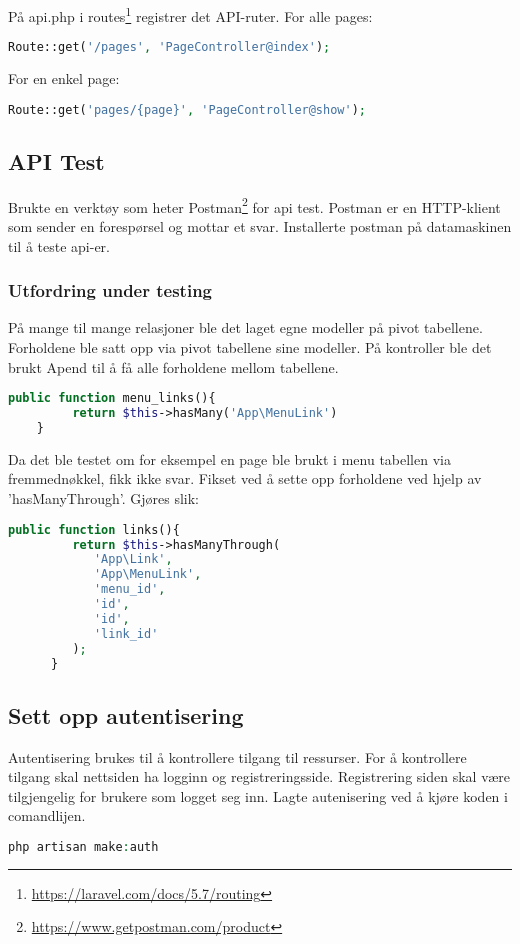 På api.php i routes\footnote{\url{https://laravel.com/docs/5.7/routing}}  registrer det API-ruter.
For alle pages:
\begin{lstlisting}[language=PHP]
    Route::get('/pages', 'PageController@index');
\end{lstlisting} 
For en enkel page:
\begin{lstlisting}[language=PHP]
    Route::get('pages/{page}', 'PageController@show');
\end{lstlisting}

\subsection{API Test}
Brukte en verktøy som heter Postman\footnote{\url{https://www.getpostman.com/product}} for api test. Postman er en HTTP-klient som sender en forespørsel og mottar et svar. Installerte postman på datamaskinen til å teste api-er.
\subsubsection{Utfordring under testing} 
På mange til mange relasjoner ble  det laget egne modeller på pivot tabellene.
Forholdene ble satt opp via pivot tabellene sine modeller. På kontroller ble det brukt  Apend til å få alle forholdene mellom tabellene. 
\begin{lstlisting}[language=PHP]
    public function menu_links(){
         return $this->hasMany('App\MenuLink')
    }
\end{lstlisting}
Da det ble testet om for eksempel en page ble brukt i menu tabellen via fremmednøkkel, fikk ikke svar.
Fikset ved å sette opp forholdene ved hjelp av 'hasManyThrough'. Gjøres slik:
\begin{lstlisting}[language=PHP]
    public function links(){
         return $this->hasManyThrough(    
            'App\Link',
            'App\MenuLink',
            'menu_id',
            'id',
            'id',
            'link_id'
         );
      }
\end{lstlisting}

\subsection{Sett opp autentisering}
Autentisering brukes til å kontrollere tilgang til ressurser. For å kontrollere tilgang skal nettsiden ha logginn og registreringsside. Registrering siden skal være tilgjengelig for brukere som logget seg inn. 
Lagte autenisering ved å kjøre koden i comandlijen.
\begin{lstlisting}[language=PHP]
    php artisan make:auth 
\end{lstlisting} 
    
